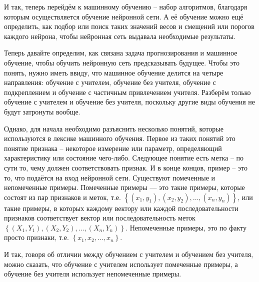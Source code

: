{	\par \redline И так, теперь перейдём к машинному обучению {--} набор алгоритмов, благодаря которым осуществляется обучение нейронной сети. А её обучение можно ещё определить, как подбор или поиск таких значений весов и смещений или порогов каждого нейрона, чтобы нейронная сеть выдавала необходимые результаты. 
	
	\par \redline Теперь давайте определим, как связана задача прогнозирования и машинное обучение, чтобы обучить нейронную сеть предсказывать будущее. Чтобы это понять, нужно иметь ввиду, что машинное обучение делится на четыре направления: обучение с учителем, обучение без учителя, обучение с подкреплением и обучение с частичным привлечением учителя. Разберём только обучение с учителем и обучение без учителя, поскольку другие виды обучения не будут затронуты вообще. 
	
	\par \redline Однако, для начала необходимо разъяснить несколько понятий, которые используются в лексике машинного обучения. Первое из таких понятий это понятие признака {--} некоторое измерение или параметр, определяющий характеристику или состояние чего-либо. Следующее понятие есть метка {--} по сути то, чему должен соответствовать признак.  И в конце концов, пример {--} это то, что подаётся на вход нейронной сети. Существуют помеченные и непомеченные примеры. Помеченные примеры — это такие примеры, которые состоят из пар признаков и меток, т.е. $\left\{\left(x_{1}, y_{1}\right), \left(x_{2}, y_{2}\right), \dots, \left(x_{n}, y_{n}\right)\right\}$, или такие примеры, в которых каждому вектору или каждой последовательности признаков соответствует вектор или последовательность меток $\left\{\left(X_{1}, Y_{1}\right), \left(X_{2}, Y_{2}\right), \dots, \left(X_{n}, Y_{n}\right)\right\}$. Непомеченные примеры, это по факту просто признаки, т.е. $\left\{x_{1}, x_{2}, \dots, x_{n}\right\}$. 
	
	\par \redline И так, говоря об отличии между обучением с учителем и обучением без учителя, можно сказать, что обучение с учителем использует помеченные примеры, а обучение без учителя использует непомеченные примеры. 
	
}
